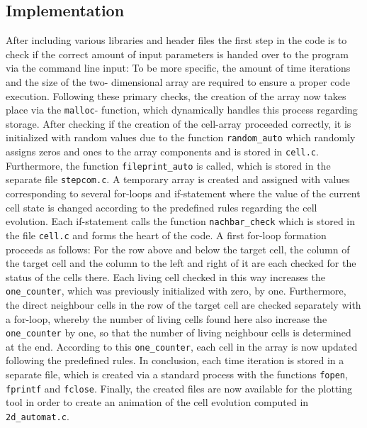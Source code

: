 \documentclass[12pt,a4paper]{article}
\begin{document}
\subsection{Implementation}
After including various libraries and header files the first step in the code is to check if the
correct amount of input parameters is handed over to the program via the command line
input: To be more specific, the amount of time iterations and the size of the two-
dimensional array are required to ensure a proper code execution.
\newline
Following these primary checks, the creation of the array now takes place via the \texttt{malloc}-
function, which dynamically handles this process regarding storage. After checking if the
creation of the cell-array proceeded correctly, it is initialized with random values due to
the function \texttt{random\_auto} which randomly assigns zeros and ones to the array
components and is stored in \texttt{cell.c}.
\newline
Furthermore, the function \texttt{fileprint\_auto} is called, which is stored in the separate file
\texttt{stepcom.c}. A temporary array is created and assigned with values corresponding to
several for-loops and if-statement where the value of the current cell state is changed
according to the predefined rules regarding the cell evolution.
\newline
Each if-statement calls the function \texttt{nachbar\_check} which is stored in the file \texttt{cell.c}
and forms the heart of the code.
\newline
A first for-loop formation proceeds as follows: For the row above and below the target
cell, the column of the target cell and the column to the left and right of it are each
checked for the status of the cells there. Each living cell checked in this way increases the
\texttt{one\_counter}, which was previously initialized with zero, by one. Furthermore, the direct
neighbour cells in the row of the target cell are checked separately with a for-loop,
whereby the number of living cells found here also increase the \texttt{one\_counter} by one, so
that the number of living neighbour cells is determined at the end. According to this
\texttt{one\_counter}, each cell in the array is now updated following the predefined rules.
In conclusion, each time iteration is stored in a separate file, which is created via a
standard process with the functions \texttt{fopen}, \texttt{fprintf} and \texttt{fclose}.
\newline
Finally, the created files are now available for the plotting tool in order to create an
animation of the cell evolution computed in \texttt{2d\_automat.c}.
\end{document}
